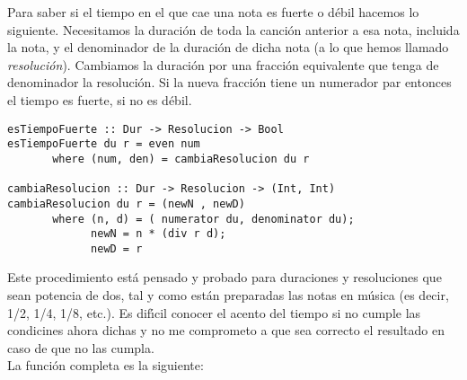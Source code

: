 Para saber si el tiempo en el que cae una nota es fuerte o d\'ebil hacemos
lo siguiente. Necesitamos la duraci\'on de toda la canci\'on anterior a esa nota,
incluida la nota, y el denominador de la duraci\'on de dicha 
nota (a lo que hemos llamado \emph{resoluci\'on}). Cambiamos la duraci\'on
por una fracci\'on equivalente que tenga de denominador la resoluci\'on. 
Si la nueva fracci\'on tiene un numerador par entonces el tiempo es fuerte,
si no es d\'ebil.\\
\small
\begin{verbatim}
esTiempoFuerte :: Dur -> Resolucion -> Bool
esTiempoFuerte du r = even num
       where (num, den) = cambiaResolucion du r

cambiaResolucion :: Dur -> Resolucion -> (Int, Int)
cambiaResolucion du r = (newN , newD)
       where (n, d) = ( numerator du, denominator du);
             newN = n * (div r d);
             newD = r
\end{verbatim}
\normalsize
\indent Este procedimiento est\'a pensado y probado para duraciones y resoluciones
que sean potencia de dos, tal y como est\'an preparadas las notas en m\'usica
(es decir, 1/2, 1/4, 1/8, etc.). Es dif\'\i cil conocer el acento del tiempo
si no cumple las condicines ahora dichas y no me comprometo a que sea
correcto el resultado en caso de que no las cumpla.\\
\indent La funci\'on completa es la siguiente:\\

\small

